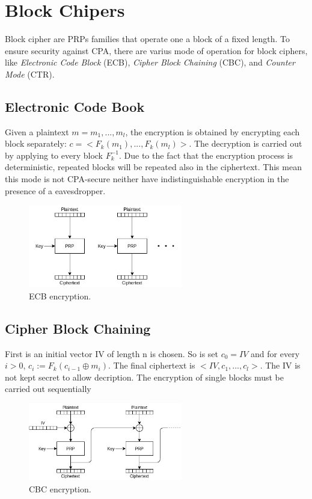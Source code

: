 \section{Block Chipers}
Block cipher are PRPs families that operate one a block of a fixed length. To ensure security against CPA, there are varius mode of operation for block ciphers, like \emph{Electronic Code Block} (ECB), \emph{Cipher Block Chaining} (CBC), and \emph{Counter Mode} (CTR).

\subsection{Electronic Code Book}
Given a plaintext $m = m_1,...,m_l$, the encryption is obtained by encrypting each block separately: $c = <F_k(m_1),...,F_k(m_l)>$.
The decryption is carried out by applying to every block $F_k^{-1}$. Due to the fact that the encryption process is deterministic, repeated blocks will be repeated also in the ciphertext. This mean this mode is not CPA-secure neither have indistinguishable encryption in the presence of a eavesdropper.
\begin{figure}[H]
    \centering
    \includegraphics[width=0.6\textwidth]{img/private-key/ecb.jpg}
    \caption{ECB encryption.}
\end{figure}

\subsection{Cipher Block Chaining}
First is an initial vector IV of length n is chosen. So is set $c_0 = IV$ and for every $i > 0$, $c_i := F_k(c_{i-1} \oplus m_i)$. The final ciphertext is $<IV,c_1,...,c_l>$. The IV is not kept secret to allow decription. The encryption of single blocks must be carried out sequentially
\begin{figure}[H]
    \centering
    \includegraphics[width=0.6\textwidth]{img/private-key/cbc.jpg}
    \caption{CBC encryption.}
\end{figure}

